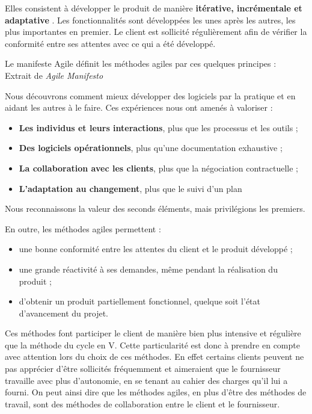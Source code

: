 
Elles consistent à développer le produit de manière \textbf{itérative, incrémentale et adaptative} . Les fonctionnalités sont développées les unes après les autres, les plus importantes en premier. Le client est sollicité régulièrement afin de vérifier la conformité entre ses attentes avec ce qui a été développé.

Le manifeste Agile  définit les méthodes agiles par ces quelques principes :\\

Extrait de \textit{Agile Manifesto}

\begin{Quote}
Nous découvrons comment mieux développer des logiciels par la pratique et en aidant les autres à le faire.
Ces expériences nous ont amenés à valoriser :

\begin{itemize}
\item \textbf{Les individus et leurs interactions}, plus que les processus et les outils ;
\item \textbf{Des logiciels opérationnels}, plus qu’une documentation exhaustive ;
\item \textbf{La collaboration avec les clients}, plus que la négociation contractuelle ;
\item \textbf{L’adaptation au changement}, plus que le suivi d’un plan
\end{itemize}

Nous reconnaissons la valeur des seconds éléments, mais privilégions les premiers.
\end{Quote}

En outre, les méthodes agiles permettent :

\begin{itemize}
\item une bonne conformité entre les attentes du client et le produit développé ;
\item une grande réactivité à ses demandes, même pendant la réalisation du produit ;
\item d'obtenir un produit partiellement fonctionnel, quelque soit l'état d'avancement du projet.
\end{itemize}

Ces méthodes font participer le client de manière bien plus intensive et régulière que la méthode du cycle en V. Cette particularité est donc à prendre en compte avec attention lors du choix de ces méthodes. En effet certains clients peuvent ne pas apprécier d'être sollicités fréquemment et aimeraient que le fournisseur travaille avec plus d'autonomie, en se tenant au cahier des charges qu'il lui a fourni. On peut ainsi dire que les méthodes agiles, en plus d'être des méthodes de travail, sont des méthodes de collaboration entre le client et le fournisseur.

